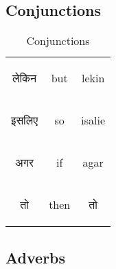 \newpage
\subsection{Conjunctions}
\begin{table}[H]
    \centering
    \begin{tabular}{c|c|c}
\begin{hindi} लेकिन \end{hindi} & but & lekin \\  
 \begin{hindi} इसलिए \end{hindi} & so & isalie \\  
  \begin{hindi} अगर \end{hindi} & if & agar \\  
    \begin{hindi} तो \end{hindi} & then & तो \\  
    \end{tabular}
    \caption{Conjunctions}
    \label{tab:conjunctions}
\end{table}	

\newpage
\subsection{Adverbs}

